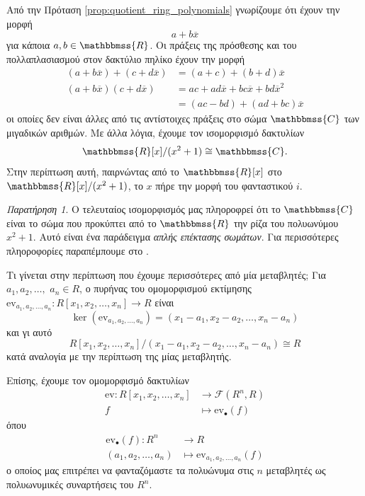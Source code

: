 \documentclass[12pt,a4paper,reqno]{amsart}
\theoremstyle{definition}
\theoremstyle{remark}
\newtheorem*{remark}{Παρατήρηση}
\numberwithin{theorem}{section}
\numberwithin{exercise}{section}
\numberwithin{equation}{section}
\newcommand{\RR}{\mathbbmss{R}}
\newcommand{\CC}{\mathbbmss{C}}
\newcommand{\fF}{\mathcal{F}}
\renewcommand{\to}{\rightarrow}
\newcommand{\ol}{\overline}
\newcommand{\ev}{\mathrm{ev}}
\begin{document}
Από την Πρόταση \ref{prop:quotient_ring_polynomials} γνωρίζουμε ότι έχουν την μορφή 
\[
a + b\ol{x}
\]
για κάποια $a, b \in \RR$. Οι πράξεις της πρόσθεσης και του πολλαπλασιασμού στον δακτύλιο πηλίκο έχουν την μορφή 
\begin{align*}
    (a+b\ol{x}) + (c + d\ol{x}) &= (a+c) + (b+d)\ol{x} \\
    (a+b\ol{x})(c + d\ol{x}) &= ac + ad\ol{x} + bc\ol{x} + bd\ol{x}^2 \\
    &= (ac -bd) + (ad + bc)\ol{x}
\end{align*}
οι οποίες δεν είναι άλλες από τις αντίστοιχες πράξεις στο σώμα $\CC$ των μιγαδικών αριθμών. Με άλλα λόγια, έχουμε τον ισομορφισμό δακτυλίων 
\[
\RR[x]/(x^2+1) \cong \CC.
\]
Στην περίπτωση αυτή, παιρνώντας από το $\RR[x]$ στο $\RR[x]/(x^2+1)$, το $x$ πήρε την μορφή του φανταστικού $i$.

\begin{remark}
    Ο τελευταίος ισομορφισμός μας πληοροφρεί ότι το $\CC$ είναι το σώμα που προκύ\-πτει από το $\RR$  την ρίζα του πολυωνύμου $x^2+1$. Αυτό είναι ένα παράδειγμα \emph{απλής επέκτασης σωμάτων}. Για περισσότερες πληοροφορίες παραπέμπουμε στο \cite[Κεφάλαιο 13]{DF04}.
\end{remark}

Τι γίνεται στην περίπτωση που έχουμε περισσότερες από μία μεταβλητές; Για $a_1, a_2,\dots,$ $a_n \in R$, ο πυρήνας του ομομορφισμού εκτίμησης $\ev_{a_1, a_2, \dots, a_n} : R[x_1, x_2, \dots, x_n] \to R$ είναι 
\[
\ker(\ev_{a_1, a_2, \dots, a_n}) = (x_1-a_1, x_2-a_2, \dots, x_n-a_n)
\]
και γι αυτό 
\[
R[x_1, x_2, \dots, x_n] / (x_1-a_1, x_2-a_2, \dots, x_n-a_n) \cong R
\]
κατά αναλογία με την περίπτωση της μίας μεταβλητής. 

Επίσης, έχουμε τον ομομορφισμό δακτυλίων 
\begin{align*}
        \ev : R[x_1, x_2, \dots, x_n] &\to \fF(R^n,R) \\
                f  &\mapsto \ev_{\bullet}(f)
    \end{align*}
    όπου 
    \begin{align*}
        \ev_{\bullet}(f) : R^n &\to R \\
                           (a_1, a_2, \dots, a_n) &\mapsto \ev_{a_1, a_2, \dots, a_n}(f)
\end{align*}
ο οποίος μας επιτρέπει να φανταζόμαστε τα πολυώνυμα στις $n$ μεταβλητές ως πολυωνυμικές συναρτήσεις του $R^n$. 
\end{document}
